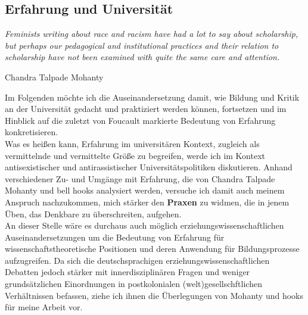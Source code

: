\subsection{Erfahrung und Universität}
\epigraph{ 
\textit {Feminists writing about race and racism have had a lot to 
say about scholarship, but perhaps our pedagogical and institutional practices and their relation to scholarship have not been examined with quite the same care and attention.} 
  }{Chandra Talpade Mohanty\footnotemark}  

Im Folgenden möchte ich die Auseinandersetzung damit, wie Bildung und Kritik
an der Universität gedacht und praktiziert werden können, fortsetzen und im
Hinblick auf die zuletzt von Foucault markierte Bedeutung von Erfahrung
konkretisieren.\\
Was es heißen kann, Erfahrung im universitären Kontext, zugleich als
vermittelnde und vermittelte Größe zu begreifen, werde ich im Kontext
antisexistischer und antirassistischer Universitätspolitiken diskutieren.
Anhand verschiedener Zu- und Umgänge mit Erfahrung, die von Chandra Talpade
Mohanty und bell hooks analysiert werden, versuche ich damit auch meinem
Anspruch nachzukommen, mich stärker den \textbf{Praxen} zu widmen, die in jenem Üben,
das Denkbare zu überschreiten, aufgehen.\\
An dieser Stelle wäre es durchaus auch
möglich  erziehungswissenschaftlichen Auseinandersetzungen um die Bedeutung von
Erfahrung für wissenschaftstheoretische Positionen und deren Anwendung für
Bildungsprozesse  aufzugreifen. Da sich die deutschsprachigen
erziehungswissenschaftlichen Debatten\footnotemark {} jedoch stärker mit innerdisziplinären Fragen und
weniger grundsätzlichen Einordnungen in postkolonialen (welt)gesellschftlichen
Verhältnissen befassen, ziehe ich ihnen die Überlegungen von  Mohanty und hooks
für meine Arbeit vor.\\

